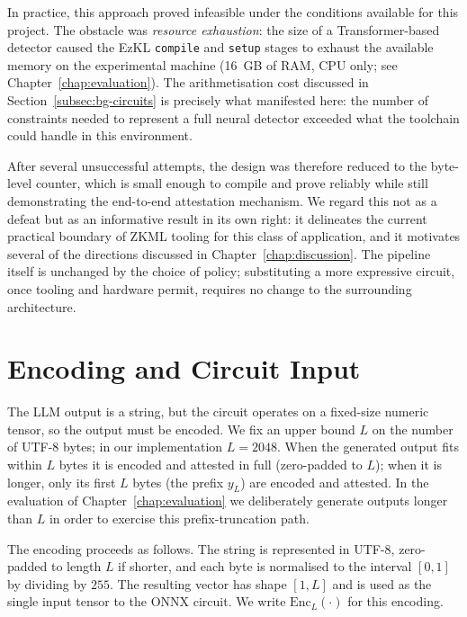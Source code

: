 \medskip

In practice, this approach proved infeasible under the conditions available for this project. The obstacle was \emph{resource exhaustion}: the size of a Transformer-based detector caused the EzKL \texttt{compile} and \texttt{setup} stages to exhaust the available memory on the experimental machine (16~GB of RAM, CPU only; see Chapter~\ref{chap:evaluation}). The arithmetisation cost discussed in Section~\ref{subsec:bg-circuits} is precisely what manifested here: the number of constraints needed to represent a full neural detector exceeded what the toolchain could handle in this environment.

\medskip

After several unsuccessful attempts, the design was therefore reduced to the byte-level counter, which is small enough to compile and prove reliably while still demonstrating the end-to-end attestation mechanism. We regard this not as a defeat but as an informative result in its own right: it delineates the current practical boundary of ZKML tooling for this class of application, and it motivates several of the directions discussed in Chapter~\ref{chap:discussion}. The pipeline itself is unchanged by the choice of policy; substituting a more expressive circuit, once tooling and hardware permit, requires no change to the surrounding architecture.

\section{Encoding and Circuit Input}
\label{sec:sd-encoding}

The LLM output is a string, but the circuit operates on a fixed-size numeric tensor, so the output must be encoded. We fix an upper bound $L$ on the number of UTF-8 bytes; in our implementation $L = 2048$. When the generated output fits within $L$ bytes it is encoded and attested in full (zero-padded to $L$); when it is longer, only its first $L$ bytes (the prefix $y_L$) are encoded and attested. In the evaluation of Chapter~\ref{chap:evaluation} we deliberately generate outputs longer than $L$ in order to exercise this prefix-truncation path.

\medskip

The encoding proceeds as follows. The string is represented in UTF-8, zero-padded to length $L$ if shorter, and each byte is normalised to the interval $[0,1]$ by dividing by $255$. The resulting vector has shape $[1, L]$ and is used as the single input tensor to the ONNX circuit. We write $\mathrm{Enc}_L(\cdot)$ for this encoding.


